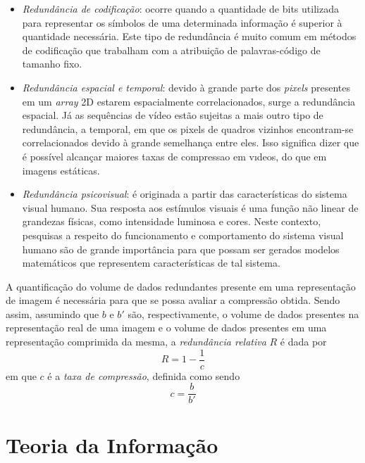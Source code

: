 \begin{itemize}
 \item \textit{Redundância de codificação}: ocorre quando a quantidade de bits utilizada para representar os símbolos de uma determinada informação é superior à quantidade necessária. Este tipo de redundância é muito comum em métodos de codificação que trabalham com a atribuição de palavras-código de tamanho fixo.
 
 \item \textit{Redundância espacial e temporal}: devido à grande parte dos \textit{pixels} presentes em um \textit{array} 2D estarem espacialmente
 correlacionados, surge a redundância espacial. Já as sequências de vídeo estão sujeitas a mais outro tipo de redundância, a temporal, em que os pixels de quadros vizinhos encontram-se correlacionados devido à grande semelhança entre eles. Isso significa dizer que é possível alcançar maiores
taxas de compressao em vıdeos, do que em imagens estáticas.
 
 \item \textit{Redundância psicovisual}: é originada a partir das características do sistema visual humano. Sua resposta aos estímulos visuais é uma função
 não linear de grandezas físicas, como intensidade luminosa e cores. Neste contexto, pesquisas a respeito do funcionamento e comportamento do sistema visual humano são de grande importância para que possam ser gerados modelos matemáticos que representem características de tal sistema.
\end{itemize}



A quantificação do volume de dados redundantes presente em uma representação de imagem é necessária para que se possa avaliar a compressão obtida. Sendo assim, assumindo que $ b $ e $ b' $ são, respectivamente, o volume de dados presentes na representação real de uma imagem e o volume de dados
presentes em uma representação comprimida da mesma, a \textit{redundância relativa} $ R $ é dada por \cite{Gonzalez2006}
\begin{equation}
\label{eqR}
 R = 1-\frac{1}{c}
\end{equation}
em que $c$ é a \textit{taxa de compressão}, definida como sendo
\begin{equation}
\label{eqc}
 c=\frac{b}{b'}
\end{equation}

\section{Teoria da Informação}
\label{teoriadainformacao}

